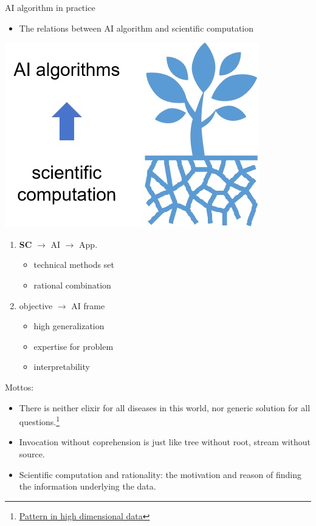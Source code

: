 \documentclass[11pt]{beamer}
\newcommand{\uniitem}[1]{\begin{itemize}\item #1 \end{itemize}}
\newcommand{\ftref}[2]{{\color{blue}\footnotesize \href{#1}{#2}}}
\begin{document}
\begin{frame}{AI algorithm in practice}
	\uniitem{The relations between AI algorithm and scientific computation}
	\begin{minipage}[t]{0.5\textwidth}
		\vspace{0pt}
		\centering
		\includegraphics[scale=0.85]{tree.jpg}
    \end{minipage}%
    \hfill
    \begin{minipage}[t]{0.45\textwidth}
        \vspace{0pt}
        \begin{enumerate}
        	\item \textbf{SC} $\rightarrow$ AI $\rightarrow$ App.\\
        		\uniitem{technical methods set}
        		\uniitem{rational combination}
			\item objective $\rightarrow$ AI frame\\
				\uniitem{high generalization}
				\uniitem{expertise for problem}
				\uniitem{interpretability}
        \end{enumerate}
    \end{minipage}
\end{frame}

\begin{frame}{Mottos: }
	\uniitem{There is neither elixir for all diseases in this world, nor generic solution for all questions.\footnote[frame]{\ftref{https://informatics.readthedocs.io/en/latest/supplement/supp\_a1.html\#id4}{Pattern in high dimensional data}}}
	\uniitem{Invocation without coprehension is just like tree without root, stream without source.}
	\uniitem{Scientific computation and rationality: the motivation and reason of finding the information underlying the data.}
\end{frame}
\end{document}
